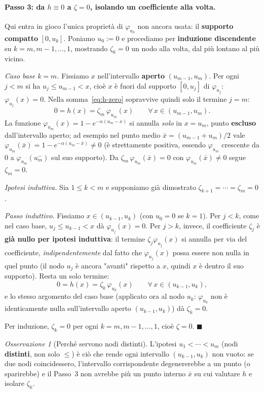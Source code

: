 \documentclass[11pt,a4paper]{article}
\theoremstyle{plain}
\theoremstyle{definition}
\theoremstyle{remark}
\newtheorem*{osservazione}{Osservazione}
\begin{document}
\paragraph{Passo 3: da $h\equiv 0$ a $\zeta=0$, isolando un coefficiente alla volta.} Qui entra
in gioco l'unica proprietà di $\varphi_{u_k}$ non ancora usata: il \textbf{supporto compatto}
$[0,u_k]$. Poniamo $u_0:=0$ e procediamo per \textbf{induzione discendente} su
$k=m,m-1,\ldots,1$, mostrando $\zeta_k=0$ un nodo alla volta, dal più lontano al più vicino.

\emph{Caso base $k=m$.} Fissiamo $x$ nell'intervallo \textbf{aperto} $(u_{m-1},u_m)$. Per ogni
$j<m$ si ha $u_j\le u_{m-1}<x$, cioè $x$ è fuori dal supporto $[0,u_j]$ di $\varphi_{u_j}$:
$\varphi_{u_j}(x)=0$. Nella somma~\eqref{eq:h-zero} sopravvive quindi solo il termine $j=m$:
\[
  0 = h(x) = \zeta_m\,\varphi_{u_m}(x) \qquad \forall\, x\in(u_{m-1},u_m).
\]
La funzione $\varphi_{u_m}(x)=1-e^{-\alpha(u_m-x)}$ si annulla \emph{solo} in $x=u_m$, punto
\textbf{escluso} dall'intervallo aperto; ad esempio nel punto medio
$\bar x=(u_{m-1}+u_m)/2$ vale $\varphi_{u_m}(\bar x)=1-e^{-\alpha(u_m-\bar x)}\neq 0$ (è
strettamente positiva, essendo $\varphi_{u_m}$ crescente da $0$ a $\varphi_{u_m}(u_m^-)$ sul suo
supporto). Da $\zeta_m\,\varphi_{u_m}(\bar x)=0$ con $\varphi_{u_m}(\bar x)\neq 0$ segue
$\zeta_m=0$.

\emph{Ipotesi induttiva.} Sia $1\le k<m$ e supponiamo già dimostrato $\zeta_{k+1}=\cdots=\zeta_m=0$.

\emph{Passo induttivo.} Fissiamo $x\in(u_{k-1},u_k)$ (con $u_0=0$ se $k=1$). Per $j<k$, come nel
caso base, $u_j\le u_{k-1}<x$ dà $\varphi_{u_j}(x)=0$. Per $j>k$, invece, il coefficiente
$\zeta_j$ è \textbf{già nullo per ipotesi induttiva}: il termine $\zeta_j\varphi_{u_j}(x)$ si
annulla per via del coefficiente, \emph{indipendentemente} dal fatto che $\varphi_{u_j}(x)$
possa essere non nulla in quel punto (il nodo $u_j$ è ancora "avanti" rispetto a $x$, quindi
$x$ è dentro il suo supporto). Resta un solo termine:
\[
  0 = h(x) = \zeta_k\,\varphi_{u_k}(x) \qquad \forall\, x\in(u_{k-1},u_k),
\]
e lo stesso argomento del caso base (applicato ora al nodo $u_k$: $\varphi_{u_k}$ non è
identicamente nulla sull'intervallo aperto $(u_{k-1},u_k)$) dà $\zeta_k=0$.

Per induzione, $\zeta_k=0$ per ogni $k=m,m-1,\ldots,1$, cioè $\zeta=0$. $\blacksquare$

\begin{osservazione}[Perché servono nodi distinti]
L'ipotesi $u_1<\cdots<u_m$ (nodi \textbf{distinti}, non solo $\le$) è ciò che rende ogni
intervallo $(u_{k-1},u_k)$ non vuoto: se due nodi coincidessero, l'intervallo corrispondente
degenererebbe a un punto (o sparirebbe) e il Passo~3 non avrebbe più un punto interno $\bar x$
su cui valutare $h$ e isolare $\zeta_k$.
\end{osservazione}
\end{document}

